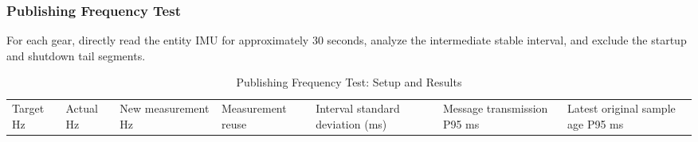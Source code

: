 

\subsubsection{Publishing Frequency Test}\label{s08-detail-5}

For each gear, directly read the entity IMU for approximately 30 seconds, analyze the intermediate stable interval, and exclude the startup and shutdown tail segments.

\FloatBarrier\begingroup\small\setlength{\tabcolsep}{2.5pt}
\begin{longtable}[]{@{}
  >{\raggedright\arraybackslash}p{}
  >{\raggedright\arraybackslash}p{}
  >{\raggedright\arraybackslash}p{}
  >{\raggedright\arraybackslash}p{}
  >{\raggedright\arraybackslash}p{}
  >{\raggedright\arraybackslash}p{}
  >{\raggedright\arraybackslash}p{}@{}}
\caption{Publishing Frequency Test: Setup and Results}\label{tab:s08-2}\tabularnewline
\toprule\noalign{}
\begin{minipage}[b]{\linewidth}\raggedright
Target Hz
\end{minipage} & \begin{minipage}[b]{\linewidth}\raggedright
Actual Hz
\end{minipage} & \begin{minipage}[b]{\linewidth}\raggedright
New measurement Hz
\end{minipage} & \begin{minipage}[b]{\linewidth}\raggedright
Mea\-sure\-ment reuse
\end{minipage} & \begin{minipage}[b]{\linewidth}\raggedright
Interval standard de\-vi\-a\-tion (ms)
\end{minipage} & \begin{minipage}[b]{\linewidth}\raggedright
Message transmission P95 ms
\end{minipage} & \begin{minipage}[b]{\linewidth}\raggedright
Latest original sample age P95 ms

\end{minipage}
\end{longtable}
